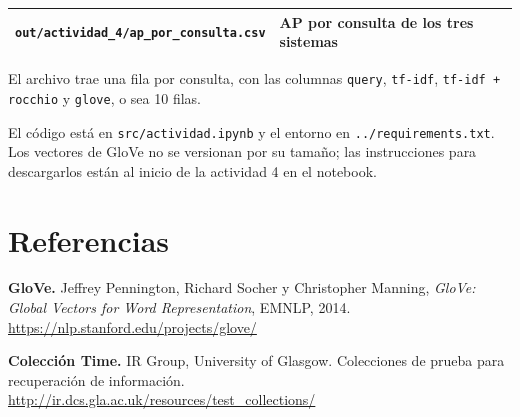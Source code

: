 \documentclass[11pt,letterpaper]{article}
\begin{document}
\begin{center}
\begin{tabular}{ll}
    \toprule
    \texttt{out/actividad\_4/ap\_por\_consulta.csv}
      & AP por consulta de los tres sistemas \\
    \bottomrule
\end{tabular}
\end{center}

El archivo trae una fila por consulta, con las columnas
\texttt{query}, \texttt{tf-idf}, \texttt{tf-idf + rocchio} y
\texttt{glove}, o sea 10 filas.

El código está en \texttt{src/actividad.ipynb} y el entorno en
\texttt{../requirements.txt}. Los vectores de GloVe no se versionan
por su tamaño; las instrucciones para descargarlos están al inicio de
la actividad 4 en el notebook.

\section*{Referencias}

\begin{enumerate}[label={[\arabic*]}, itemsep=0.3em, leftmargin=*]
    \item \textbf{GloVe.} Jeffrey Pennington, Richard Socher y
          Christopher Manning, \emph{GloVe: Global Vectors for Word
          Representation}, EMNLP, 2014.\\
          \url{https://nlp.stanford.edu/projects/glove/}
    \item \textbf{Colección Time.} IR Group, University of Glasgow.
          Colecciones de prueba para recuperación de información.\\
          \url{http://ir.dcs.gla.ac.uk/resources/test_collections/}
\end{enumerate}
\end{document}
